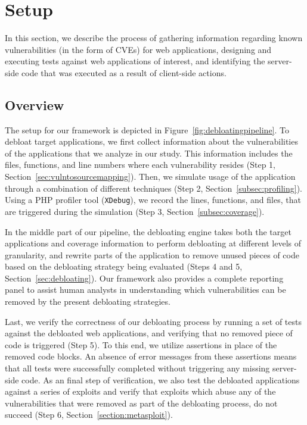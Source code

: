 

\section{Setup}
In this section, we describe the process of gathering information regarding
known vulnerabilities (in the form of CVEs) for web applications, designing
and executing tests against web applications of interest, and identifying
the server-side code that was executed as a result of client-side actions.


\subsection{Overview}
The setup for our framework is depicted in
Figure~\ref{fig:debloatingpipeline}. To debloat target applications, we first
collect information about the vulnerabilities of the applications that we
analyze in our study. This information includes the files, functions, and
line numbers where each
vulnerability resides (Step 1, Section~\ref{sec:vulntosourcemapping}). Then,
we simulate usage of the application through a combination of different
techniques (Step 2, Section~\ref{subsec:profiling}). Using a PHP profiler
tool (\texttt{XDebug}), we record the lines, functions, and files, that are
triggered during the simulation (Step 3, Section~\ref{subsec:coverage}).

In the middle part of our pipeline, the debloating engine takes both the
target applications and coverage information to perform debloating at
different levels of granularity, and rewrite parts of the application to
remove unused pieces of code based on the debloating strategy being evaluated
(Steps 4 and 5, Section~\ref{sec:debloating}). Our framework also provides
a complete reporting panel to assist human analysts in understanding which
vulnerabilities can be removed by the present debloating strategies.

Last, we verify the correctness of our debloating process by running
a set of tests against the debloated web applications, and verifying that
no removed piece of code is triggered (Step 5). To this end, we
utilize assertions in place of the removed code blocks. An absence of error
messages from these assertions means that all tests were successfully
completed without triggering any missing server-side code. As an final step of
verification, we also test the debloated applications against a series of
exploits and verify that exploits which
abuse any of the vulnerabilities that were removed as part of the debloating
process, do not succeed (Step 6, Section~\ref{section:metasploit}).

